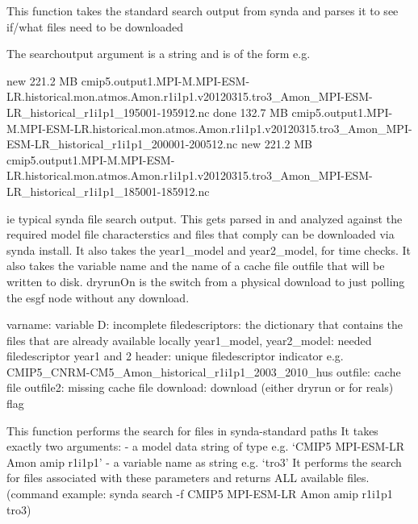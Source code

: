 \documentclass[letterpaper,10pt,english]{sphinxmanual}
\begin{document}
\begin{fulllineitems}
\label{\detokenize{index:cmip5datafinder.synda_dll}}
This function takes the standard search output from synda
and parses it to see if/what files need to be downloaded

The searchoutput argument is a string and is of the form e.g.

new   221.2 MB  cmip5.output1.MPI-M.MPI-ESM-LR.historical.mon.atmos.Amon.r1i1p1.v20120315.tro3\_Amon\_MPI-ESM-LR\_historical\_r1i1p1\_195001-195912.nc
done  132.7 MB  cmip5.output1.MPI-M.MPI-ESM-LR.historical.mon.atmos.Amon.r1i1p1.v20120315.tro3\_Amon\_MPI-ESM-LR\_historical\_r1i1p1\_200001-200512.nc
new   221.2 MB  cmip5.output1.MPI-M.MPI-ESM-LR.historical.mon.atmos.Amon.r1i1p1.v20120315.tro3\_Amon\_MPI-ESM-LR\_historical\_r1i1p1\_185001-185912.nc

ie typical synda file search output. This gets parsed in and analyzed
against the required model file characterstics and files that comply can
be downloaded via synda install. It also takes the year1\_model and year2\_model, for time checks.
It also takes the variable name and the name of a cache file outfile that will be written to disk.
dryrunOn is the switch from a physical download to just polling the esgf node without any download.

varname: variable
D: incomplete filedescriptors: the dictionary that contains the files that are already available locally
year1\_model, year2\_model: needed filedescriptor year1 and 2
header: unique filedescriptor indicator e.g. CMIP5\_CNRM-CM5\_Amon\_historical\_r1i1p1\_2003\_2010\_hus
outfile: cache file
outfile2: missing cache file
download: download (either dryrun or for reals) flag

\end{fulllineitems}


\begin{fulllineitems}
\label{\detokenize{index:cmip5datafinder.synda_search}}
This function performs the search for files in synda-standard paths
It takes exactly two arguments:
- a model data string of type e.g. `CMIP5 MPI-ESM-LR Amon amip r1i1p1'
- a variable name as string e.g. `tro3'
It performs the search for files associated with these parameters and returns ALL
available files. (command example: synda search -f CMIP5 MPI-ESM-LR Amon amip r1i1p1 tro3)

\end{fulllineitems}
\end{document}
